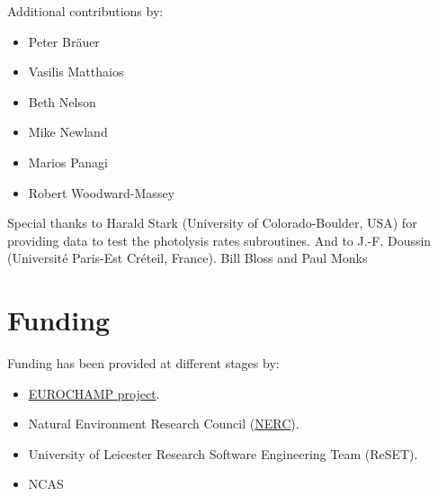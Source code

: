 Additional contributions by:

\begin{itemize}
\item Peter Br{\"a}uer
\item Vasilis Matthaios
\item Beth Nelson
\item Mike Newland
\item Marios Panagi
\item Robert Woodward-Massey
\end{itemize}

Special thanks to Harald Stark (University of Colorado-Boulder, USA)
for providing data to test the photolysis rates subroutines. And to
J.-F. Doussin (Universit{\'e} Paris-Est Cr{\'e}teil, France). Bill
Bloss and Paul Monks

\section{Funding} \label{sec:funding}

Funding has been provided at different stages by:

\begin{itemize}
\item \href{https://www.eurochamp.org/}{EUROCHAMP project}.
\item Natural Environment Research Council (\href{https://nerc.ukri.org/}{NERC}).
\item University of Leicester Research Software Engineering Team (ReSET).
\item NCAS
\end{itemize}
